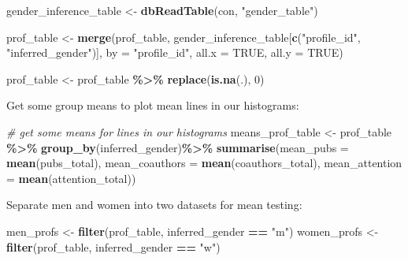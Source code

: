 \documentclass[
]{article}
\newenvironment{Shaded}{\begin{snugshade}}{\end{snugshade}}
\newcommand{\AttributeTok}[1]{\textcolor[rgb]{0.13,0.29,0.53}{#1}}
\newcommand{\CommentTok}[1]{\textcolor[rgb]{0.56,0.35,0.01}{\textit{#1}}}
\newcommand{\ConstantTok}[1]{\textcolor[rgb]{0.56,0.35,0.01}{#1}}
\newcommand{\DecValTok}[1]{\textcolor[rgb]{0.00,0.00,0.81}{#1}}
\newcommand{\FunctionTok}[1]{\textcolor[rgb]{0.13,0.29,0.53}{\textbf{#1}}}
\newcommand{\NormalTok}[1]{#1}
\newcommand{\OtherTok}[1]{\textcolor[rgb]{0.56,0.35,0.01}{#1}}
\newcommand{\SpecialCharTok}[1]{\textcolor[rgb]{0.81,0.36,0.00}{\textbf{#1}}}
\newcommand{\StringTok}[1]{\textcolor[rgb]{0.31,0.60,0.02}{#1}}
\begin{document}
\begin{Shaded}
\begin{Highlighting}[]
\NormalTok{gender\_inference\_table }\OtherTok{\textless{}{-}} \FunctionTok{dbReadTable}\NormalTok{(con, }\StringTok{"gender\_table"}\NormalTok{)}

\NormalTok{prof\_table }\OtherTok{\textless{}{-}} \FunctionTok{merge}\NormalTok{(prof\_table,}
\NormalTok{                    gender\_inference\_table[}\FunctionTok{c}\NormalTok{(}\StringTok{"profile\_id"}\NormalTok{, }\StringTok{"inferred\_gender"}\NormalTok{)],}
                    \AttributeTok{by =} \StringTok{"profile\_id"}\NormalTok{,}
                    \AttributeTok{all.x =} \ConstantTok{TRUE}\NormalTok{,}
                    \AttributeTok{all.y =} \ConstantTok{TRUE}\NormalTok{)}


\NormalTok{prof\_table }\OtherTok{\textless{}{-}}\NormalTok{ prof\_table }\SpecialCharTok{\%\textgreater{}\%}
  \FunctionTok{replace}\NormalTok{(}\FunctionTok{is.na}\NormalTok{(.), }\DecValTok{0}\NormalTok{)}
\end{Highlighting}
\end{Shaded}

Get some group means to plot mean lines in our histograms:

\begin{Shaded}
\begin{Highlighting}[]
\CommentTok{\# get some means for lines in our histograms}
\NormalTok{means\_prof\_table }\OtherTok{\textless{}{-}}\NormalTok{ prof\_table }\SpecialCharTok{\%\textgreater{}\%}
  \FunctionTok{group\_by}\NormalTok{(inferred\_gender)}\SpecialCharTok{\%\textgreater{}\%}
  \FunctionTok{summarise}\NormalTok{(}\AttributeTok{mean\_pubs =} \FunctionTok{mean}\NormalTok{(pubs\_total),}
            \AttributeTok{mean\_coauthors =} \FunctionTok{mean}\NormalTok{(coauthors\_total),}
            \AttributeTok{mean\_attention =} \FunctionTok{mean}\NormalTok{(attention\_total))}
\end{Highlighting}
\end{Shaded}

Separate men and women into two datasets for mean testing:

\begin{Shaded}
\begin{Highlighting}[]
\NormalTok{men\_profs }\OtherTok{\textless{}{-}} \FunctionTok{filter}\NormalTok{(prof\_table, inferred\_gender }\SpecialCharTok{==} \StringTok{"m"}\NormalTok{)}
\NormalTok{women\_profs }\OtherTok{\textless{}{-}} \FunctionTok{filter}\NormalTok{(prof\_table, inferred\_gender }\SpecialCharTok{==} \StringTok{"w"}\NormalTok{)}
\end{Highlighting}
\end{Shaded}
\end{document}
